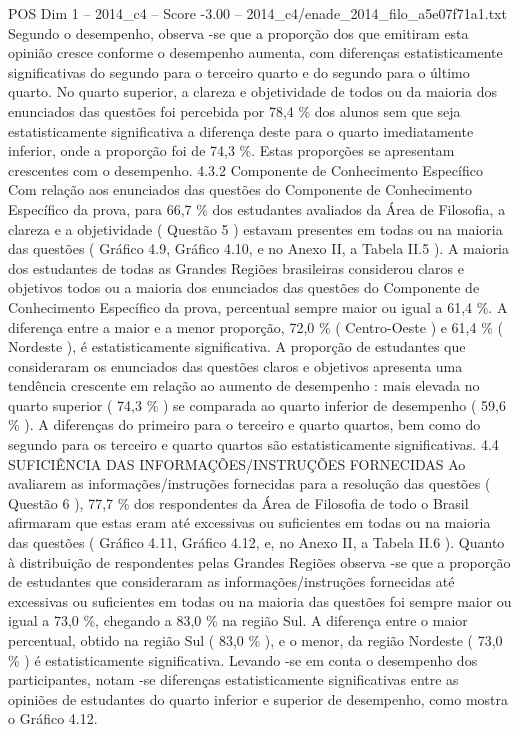 \begin{textsample}{POS Dim 1 – 2014\_c4 – Score -3.00 – 2014\_c4/enade\_2014\_filo\_a5e07f71a1.txt}
Segundo o desempenho, observa -se que a proporção dos que emitiram esta opinião cresce conforme o desempenho aumenta, com diferenças estatisticamente significativas do segundo para o terceiro quarto e do segundo para o último quarto.
No quarto superior, a clareza e objetividade de todos ou da maioria dos enunciados das questões foi percebida por 78,4 \% dos alunos sem que seja estatisticamente significativa a diferença deste para o quarto imediatamente inferior, onde a proporção foi de 74,3 \%.
Estas proporções se apresentam crescentes com o desempenho. 4.3.2 Componente de Conhecimento Específico Com relação aos enunciados das questões do Componente de Conhecimento Específico da prova, para 66,7 \% dos estudantes avaliados da Área de Filosofia, a clareza e a objetividade ( Questão 5 ) estavam presentes em todas ou na maioria das questões ( Gráfico 4.9, Gráfico 4.10, e no Anexo II, a Tabela II.5 ).
A maioria dos estudantes de todas as Grandes Regiões brasileiras considerou claros e objetivos todos ou a maioria dos enunciados das questões do Componente de Conhecimento Específico da prova, percentual sempre maior ou igual a 61,4 \%.
A diferença entre a maior e a menor proporção, 72,0 \% ( Centro-Oeste ) e 61,4 \% ( Nordeste ), é estatisticamente significativa.
A proporção de estudantes que consideraram os enunciados das questões claros e objetivos apresenta uma tendência crescente em relação ao aumento de desempenho : mais elevada no quarto superior ( 74,3 \% ) se comparada ao quarto inferior de desempenho ( 59,6 \% ).
A diferenças do primeiro para o terceiro e quarto quartos, bem como do segundo para os terceiro e quarto quartos são estatisticamente significativas. 4.4 SUFICIÊNCIA DAS INFORMAÇÕES/INSTRUÇÕES FORNECIDAS Ao avaliarem as informações/instruções fornecidas para a resolução das questões ( Questão 6 ), 77,7 \% dos respondentes da Área de Filosofia de todo o Brasil afirmaram que estas eram até excessivas ou suficientes em todas ou na maioria das questões ( Gráfico 4.11, Gráfico 4.12, e, no Anexo II, a Tabela II.6 ).
Quanto à distribuição de respondentes pelas Grandes Regiões observa -se que a proporção de estudantes que consideraram as informações/instruções fornecidas até excessivas ou suficientes em todas ou na maioria das questões foi sempre maior ou igual a 73,0 \%, chegando a 83,0 \% na região Sul.
A diferença entre o maior percentual, obtido na região Sul ( 83,0 \% ), e o menor, da região Nordeste ( 73,0 \% ) é estatisticamente significativa.
Levando -se em conta o desempenho dos participantes, notam -se diferenças estatisticamente significativas entre as opiniões de estudantes do quarto inferior e superior de desempenho, como mostra o Gráfico 4.12.

\end{textsample}
